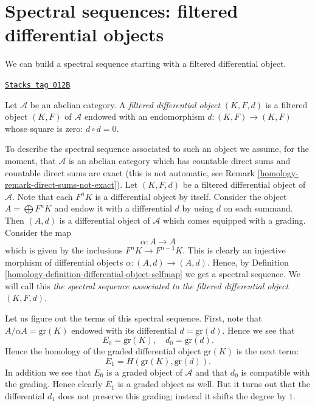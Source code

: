\section{Spectral sequences: filtered differential objects}
\label{homology-section-filtered-differential}
We can build a spectral sequence starting with a filtered
differential object.

\begin{definition}
\label{homology-definition-filtered-differential}
\href{https://stacks.math.columbia.edu/tag/012B}{\texttt{Stacks tag 012B}}

Let $\mathcal{A}$ be an abelian category.
A {\it filtered differential object} $(K, F, d)$ is a filtered object
$(K, F)$ of $\mathcal{A}$ endowed with an endomorphism
$d : (K, F) \to (K, F)$ whose square is zero: $d \circ d = 0$.
\end{definition}

To describe the spectral sequence associated to such an object
we assume, for the moment, that $\mathcal{A}$ is an abelian category
which has countable direct sums and countable direct sums are exact
(this is not automatic, see Remark \ref{homology-remark-direct-sums-not-exact}).
Let $(K, F, d)$ be a filtered differential object of $\mathcal{A}$.
Note that each $F^nK$ is a differential object by itself.
Consider the object $A = \bigoplus F^nK$ and endow it with a
differential $d$ by using $d$ on each summand.
Then $(A, d)$ is a differential object of $\mathcal{A}$
which comes equipped with a grading. Consider the map
$$
\alpha : A \to A
$$
which is given by the inclusions $F^nK \to F^{n - 1}K$.
This is clearly an injective morphism of differential objects
$\alpha : (A, d) \to (A, d)$. Hence, by
Definition \ref{homology-definition-differential-object-selfmap}
we get a spectral sequence.
We will call this {\it the spectral sequence associated to
the filtered differential object $(K, F, d)$}.

\medskip\noindent
Let us figure out the terms of this spectral sequence.
First, note that $A/\alpha A = \text{gr}(K)$
endowed with its differential $d = \text{gr}(d)$. Hence we see that
$$
E_0 = \text{gr}(K), \quad d_0 = \text{gr}(d).
$$
Hence the homology of the graded differential object $\text{gr}(K)$
is the next term:
$$
E_1 = H(\text{gr}(K), \text{gr}(d)).
$$
In addition we see that $E_0$ is a graded object of $\mathcal{A}$
and that $d_0$ is compatible with the grading. Hence clearly $E_1$
is a graded object as well. But it turns out that the differential
$d_1$ does not preserve this grading; instead it shifts the degree by $1$.

